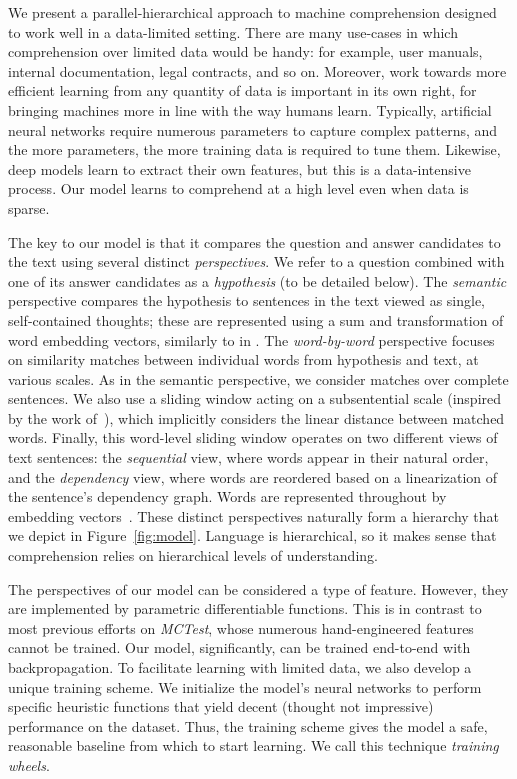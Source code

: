 \documentclass[11pt]{article}
\begin{document}
We present a parallel-hierarchical approach to machine comprehension designed to work well in a data-limited setting. There are many use-cases in which comprehension over limited data would be handy: for example, user manuals, internal documentation, legal contracts, and so on. Moreover, work towards more efficient learning from any quantity of data is important in its own right, for bringing machines more in line with the way humans learn. Typically, artificial neural networks require numerous parameters to capture complex patterns, and the more parameters, the more training data is required to tune them. Likewise, deep models learn to extract their own features, but this is a data-intensive process. Our model learns to comprehend at a high level even when data is sparse.

The key to our model is that it compares the question and answer candidates to the text using several distinct {\it perspectives}. We refer to a question combined with one of its answer candidates as a {\it hypothesis} (to be detailed below). The {\it semantic} perspective compares the hypothesis to sentences in the text viewed as single, self-contained thoughts; these are represented using a sum and transformation of word embedding vectors, similarly to in . The {\it word-by-word} perspective focuses on similarity matches between individual words from hypothesis and text, at various scales. As in the semantic perspective, we consider matches over complete sentences. We also use a sliding window acting on a subsentential scale (inspired by the work of~), which implicitly considers the linear distance between matched words. Finally, this word-level sliding window operates on two different views of text sentences: the {\it sequential} view, where words appear in their natural order, and the {\it dependency} view, where words are reordered based on a linearization of the sentence's dependency graph. Words are represented throughout by embedding vectors~\cite{mikolov2013}. These distinct perspectives naturally form a hierarchy that we depict in Figure~\ref{fig:model}. Language is hierarchical, so it makes sense that comprehension relies on hierarchical levels of understanding.

The perspectives of our model can be considered a type of feature. However, they are implemented by parametric differentiable functions. This is in contrast to most previous efforts on {\it MCTest}, whose numerous hand-engineered features cannot be trained. Our model, significantly, can be trained end-to-end with backpropagation. To facilitate learning with limited data, we also develop a unique training scheme. We initialize the model's neural networks to perform specific heuristic functions that yield decent (thought not impressive) performance on the dataset. Thus, the training scheme gives the model a safe, reasonable baseline from which to start learning. We call this technique {\it training wheels}.
\end{document}

